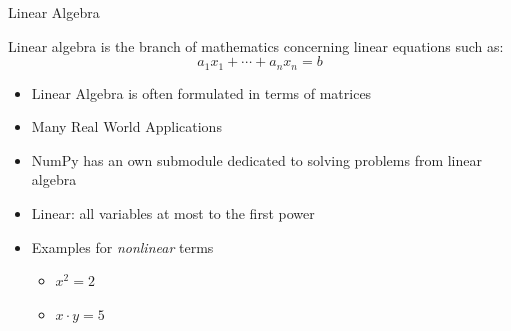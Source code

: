 
\begin{frame}{Linear Algebra}
%
\begin{tcolorbox}[title=Wikipedia]
\scriptsize
Linear algebra is the branch of mathematics concerning linear equations such as:
\[ a_{1} x_{1} + \cdots + a_{n} x_{n} = b \]
\end{tcolorbox}
%
\begin{itemize}
\item Linear Algebra is often formulated in terms of matrices
\item Many Real World Applications
\item NumPy has an own submodule dedicated to solving problems from linear algebra
\item Linear: all variables at most to the first power
\item Examples for \emph{nonlinear} terms
	\begin{itemize}
	\item $x^2 = 2$
	\item $x \cdot y = 5$
	\end{itemize}
\end{itemize}
%
\end{frame}


